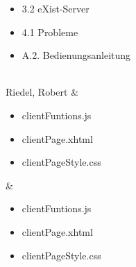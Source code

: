 \begin{table}[H]
\begin{tabu}
\begin{itemize}
		\item 3.2 eXist-Server
		\item 4.1 Probleme
		\item A.2. Bedienungsanleitung
\end{itemize}\\ \hline
		Riedel, Robert & \begin{itemize}
		\itemsep 0pt
		\item clientFuntions.js
		\item clientPage.xhtml
		\item clientPageStyle.css
\end{itemize} & \begin{itemize}
		\itemsep 0pt
		\item clientFuntions.js
		\item clientPage.xhtml
		\item clientPageStyle.css
\end{itemize}\\
	\end{tabu}
\end{table}